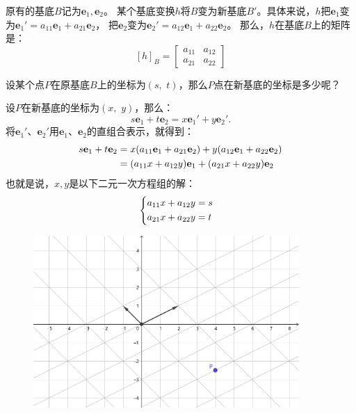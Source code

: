 \documentclass[12pt,UTF8]{ctexbook}
\begin{document}
原有的基底$B$记为$\mathbf{e}_1, \mathbf{e}_2$。
某个基底变换$h$将$B$变为新基底$B'$。具体来说，$h$把$\mathbf{e}_1$变为$\mathbf{e}_1' = a_{11}\mathbf{e}_1 + a_{21}\mathbf{e}_2$，
把$\mathbf{e}_2$变为$\mathbf{e}_2' = a_{12}\mathbf{e}_1 + a_{22}\mathbf{e}_2$。
那么，$h$在基底$B$上的矩阵是：
$$
\left[h\right]_{B} = 
\begin{bmatrix}
    a_{11} & a_{12} \\ a_{21} & a_{22}
\end{bmatrix}
$$

设某个点$P$在原基底$B$上的坐标为$(s,\,\, t)$，那么$P$点在新基底的坐标是多少呢？

设$P$在新基底的坐标为$(x,\,\, y)$，那么：
$$ s\mathbf{e}_1 + t\mathbf{e}_2 = x\mathbf{e}_1' + y\mathbf{e}_2'.$$
将$\mathbf{e}_1'$、$\mathbf{e}_2'$用$\mathbf{e}_1$、$\mathbf{e}_2$的直组合表示，就得到：
\begin{align}
    s\mathbf{e}_1 + t\mathbf{e}_2 &= x(a_{11}\mathbf{e}_1 + a_{21}\mathbf{e}_2) + y(a_{12}\mathbf{e}_1 + a_{22}\mathbf{e}_2) \notag \\
    &= (a_{11}x + a_{12}y)\mathbf{e}_1 + (a_{21}x + a_{22}y)\mathbf{e}_2 \notag
\end{align}
也就是说，$x, y$是以下二元一次方程组的解：
\begin{alignat*}{1}
    &   \begin{dcases}
            a_{11}x + a_{12}y = s \\
            a_{21}x + a_{22}y = t
        \end{dcases}
\end{alignat*}

\begin{figure}[h]
    \vspace{4pt}
    \centering
    \includegraphics[width=0.9\textwidth]{基变换1.png}
    \captionsetup{justification=centering}
\end{figure}
\end{document}
